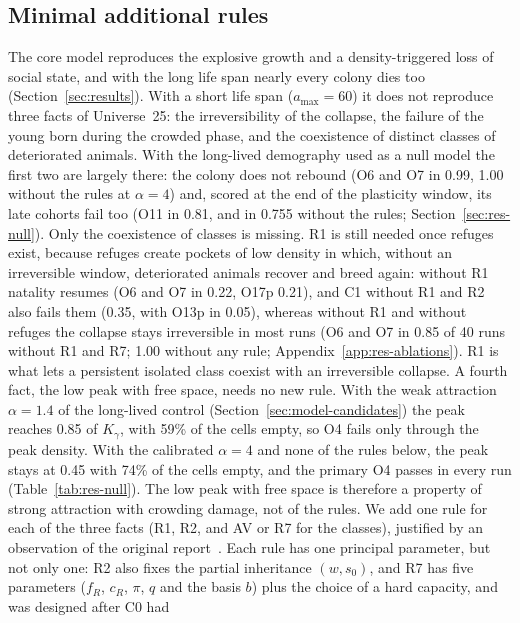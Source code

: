 \subsection{Minimal additional rules}
\label{sec:model-rules}

The core model reproduces the explosive growth and a density-triggered loss of social state, and with the long
life span nearly every colony dies too (Section~\ref{sec:results}). With a short life span ($a_{\max}=60$) it
does not reproduce three facts of Universe~25: the irreversibility of the collapse, the failure of the young born
during the crowded phase, and the coexistence of distinct classes of deteriorated animals. With the long-lived
demography used as a null model the first two are largely there: the colony does not rebound (O6 and O7 in 0.99,
1.00 without the rules at $\alpha=4$) and, scored at the end of the plasticity window, its late cohorts fail too
(O11 in 0.81, and in 0.755 without the rules; Section~\ref{sec:res-null}). Only the coexistence of classes is missing. R1 is still needed
once refuges exist, because refuges create pockets of low density in which, without an irreversible window,
deteriorated animals recover and breed again: without R1 natality resumes (O6 and O7 in 0.22, O17p 0.21), and
\textsf{C1} without R1 and R2 also fails them (0.35, with O13p in 0.05), whereas without R1 and without refuges
the collapse stays irreversible in most runs (O6 and O7 in 0.85 of 40 runs without R1 and R7; 1.00 without any rule; Appendix~\ref{app:res-ablations}). R1 is
what lets a persistent isolated class coexist with an irreversible collapse. A fourth fact, the low peak with free space, needs no new rule. With the
weak attraction $\alpha=1.4$ of the long-lived control (Section~\ref{sec:model-candidates}) the peak reaches 0.85 of $K_\gamma$, with 59\% of the cells
empty, so O4 fails only through the peak density. With the calibrated $\alpha=4$ and none of the rules below, the peak
stays at 0.45 with 74\% of the cells empty, and the primary O4 passes in every run (Table~\ref{tab:res-null}). The
low peak with free space is therefore a property of strong attraction with crowding damage, not of the rules. We add one rule for each of the three facts (R1, R2, and AV or R7 for the classes),
justified by an observation of the original report~\cite{Calhoun1973}. Each rule has one
principal parameter, but not only one: R2 also fixes the partial inheritance $(w,s_0)$, and R7 has five parameters
($f_R$, $c_R$, $\pi$, $q$ and the basis $b$) plus the choice of a hard capacity, and was designed after \textsf{C0} had
